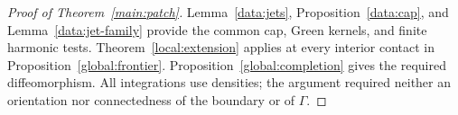 \begin{proof}[Proof of Theorem~\ref{main:patch}]
Lemma~\ref{data:jets}, Proposition~\ref{data:cap}, and
Lemma~\ref{data:jet-family} provide the common cap, Green kernels,
and finite harmonic tests. Theorem~\ref{local:extension} applies at
every interior contact
in Proposition~\ref{global:frontier}. Proposition~\ref{global:completion}
gives the required diffeomorphism. All integrations use densities;
the argument required neither an orientation nor connectedness of
the boundary or of $\Gamma$.
\end{proof}
